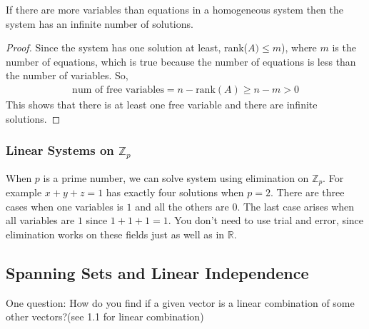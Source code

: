 \documentclass{article}
\begin{document}
If there are more variables than equations in a homogeneous system then the system has an infinite number of solutions.
\begin{proof}
Since the system has one solution at least, rank($A) \leqslant m$), where $m$ is the number of equations, which is true because the number of equations is less than the number of variables. So,
\begin{gather*}
    \textrm{num of free variables} = n - \textrm{rank}(A) \geqslant n - m > 0
\end{gather*}
This shows that there is at least one free variable and there are infinite solutions.
\end{proof}
\subsubsection{Linear Systems on $\mathbb{Z}_p$}
When $p$ is a prime number, we can solve system using elimination on $\mathbb{Z}_p$. For example $x + y + z = 1$ has exactly four solutions when $p = 2$. There are three cases when one variables is $1$ and all the others are $0$. The last case arises when all variables are $1$ since $1 + 1 + 1 = 1$. You don't need to use trial and error, since elimination works on these fields just as well as in $\mathbb{R}$.
\subsection{Spanning Sets and Linear Independence}
One question: How do you find if a given vector is a linear combination of some other vectors?(see 1.1 for linear combination)
\end{document}
